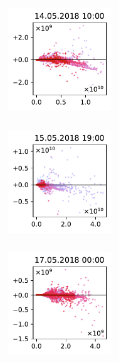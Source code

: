 \begin{figure}[H]
    \centering
    \begin{subfigure}
        \centering
        \includegraphics[width=0.30\textwidth,valign=t]{evaluation/figures/perturbations/perturbation-14.05.2018:10.00-temperature-sub-0.04K.pdf}
    \end{subfigure}
    \begin{subfigure}
        \centering
        \includegraphics[width=0.30\textwidth,valign=t]{evaluation/figures/perturbations/perturbation-15.05.2018:19.00-temperature-sub-0.04K.pdf}
    \end{subfigure}
    \begin{subfigure}
        \centering
        \includegraphics[width=0.30\textwidth,valign=t]{evaluation/figures/perturbations/perturbation-17.05.2018:00.00-temperature-sub-0.04K.pdf}
    \end{subfigure}


\end{figure}
